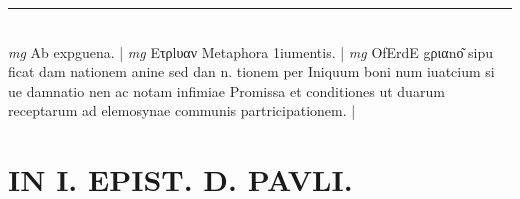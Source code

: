 \documentclass{article}
\begin{document}
\begin{pages}
\vspace{0.5cm}\noindent
\vspace{0.2cm}\rule{1cm}{0.2pt}\\ 
\hspace{0.2cm}\textit{mg}
\footnotesize Ab expguena. 
\normalsize| 
\hspace{0.2cm}\textit{mg}
\footnotesize Ετρlυαν Metaphora 1iumentis. 
\normalsize| 
\hspace{0.2cm}\textit{mg}
\footnotesize OfErdE gριαnο͂ sipu ficat dam  nationem anine sed dan n. tionem per Iniquum boni num iuatcium si ue damnatio nen ac notam infimiae Promissa et conditiones ut duarum receptarum ad elemosynae communis partricipationem. 
\normalsize| 
\section*{IN I. EPIST. D. PAVLI. }

\end{pages}
\end{document}
